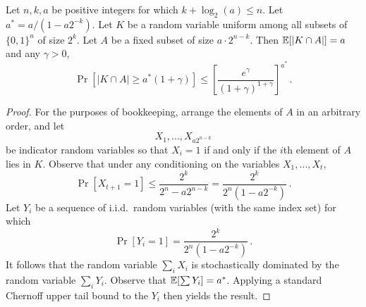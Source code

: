   \begin{theorem}
  Let $n,k,a$ be positive integers for which $k + \operatorname{log}_2(a) \leq n$.  Let $a^* = a/(1 - a2^{-k})$. Let $K$
  be a random variable uniform among all subsets of $\{0,1\}^n$ of
  size $2^k$. Let $A$ be a fixed subset of size $a \cdot 2^{n-k}$. Then
  $\operatorname*{\mathbb{E}}[|K \cap A|] = a$ and any $\gamma > 0$,
  \[
    \Pr[|K \cap A| \geq a^*(1 + \gamma)] \leq \left[\frac{e^\gamma}{(1+\gamma)^{1+\gamma}}\right]^{a^*}\,.
  \]
\end{theorem}
\begin{proof}
  For the purposes of bookkeeping, arrange the elements of $A$ in an
  arbitrary order, and let
  \[
    X_1, \ldots, X_{a2^{n-k}}
  \]
  be indicator random variables so that $X_i = 1$ if and only if the
  $i$th element of $A$ lies in $K$.  Observe that under any conditioning on the
  variables $X_1, \ldots, X_t$,
  \[
    \Pr[X_{t+1} = 1] \leq \frac{2^k}{2^n - a2^{n-k}} = \frac{2^k}{2^n(1 - a2^{-k})}\,.
  \]
   Let $Y_i$ be a sequence of
  i.i.d.\ random variables (with the same index set) for which
  \[
    \Pr[Y_i = 1] = \frac{2^{k}}{2^n(1 - a2^{-k})}\,.
  \]It follows that the random variable $\sum_i X_i$ is stochastically
  dominated by the random variable $\sum_i Y_i$. Observe that
  $\operatorname*{\mathbb{E}}[\sum Y_i] = a^*$. Applying a standard Chernoff upper tail
  bound to the $Y_i$ then yields the result.
\end{proof}